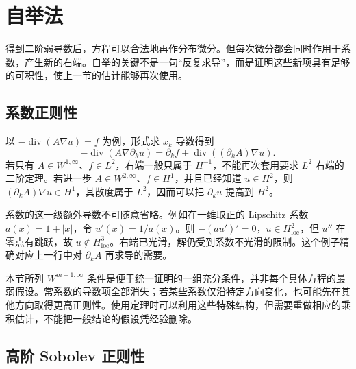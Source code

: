 \section{自举法}
\label{b2:sec:1602}

得到二阶弱导数后，方程可以合法地再作分布微分。但每次微分都会同时作用于系数，产生新的右端。自举的关键不是一句“反复求导”，而是证明这些新项具有足够的可积性，使上一节的估计能够再次使用。

\subsection{系数正则性}
\label{b2:subsec:160201}

以 \(-\operatorname{div}(A\nabla u)=f\) 为例，形式求 \(x_k\) 导数得到
\[
 -\operatorname{div}(A\nabla\partial_ku)
 =\partial_kf+\operatorname{div}((\partial_kA)\nabla u).
\]
若只有 \(A\in W^{1,\infty}\)、\(f\in L^2\)，右端一般只属于 \(H^{-1}\)，不能再次套用要求 \(L^2\) 右端的二阶定理。若进一步 \(A\in W^{2,\infty}\)、\(f\in H^1\)，并且已经知道 \(u\in H^2\)，则 \((\partial_kA)\nabla u\in H^1\)，其散度属于 \(L^2\)，因而可以把 \(\partial_ku\) 提高到 \(H^2\)。

\ProseParagraphBreak

系数的这一级额外导数不可随意省略。例如在一维取正的 Lipschitz 系数 \(a(x)=1+|x|\)，令 \(u'(x)=1/a(x)\)。则 \(-(au')'=0\)，\(u\in H_{\mathrm{loc}}^2\)，但 \(u''\) 在零点有跳跃，故 \(u\notin H_{\mathrm{loc}}^3\)。右端已光滑，解仍受到系数不光滑的限制。这个例子精确对应上一行中对 \(\partial_kA\) 再求导的需要。

\ProseParagraphBreak

本节所列 \(W^{m+1,\infty}\) 条件是便于统一证明的一组充分条件，并非每个具体方程的最弱假设。常系数的导数项全部消失；若某些系数仅沿特定方向变化，也可能先在其他方向取得更高正则性。使用定理时可以利用这些特殊结构，但需要重做相应的乘积估计，不能把一般结论的假设凭经验删除。

\subsection{高阶 Sobolev 正则性}
\label{b2:subsec:160202}

